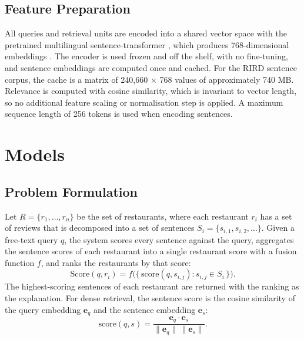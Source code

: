\subsection{Feature Preparation}
\label{sec:features}

All queries and retrieval units are encoded into a shared vector space with the pretrained multilingual sentence-transformer \mpnet{}, which produces 768-dimensional embeddings \citep{reimers2019}. The encoder is used frozen and off the shelf, with no fine-tuning, and sentence embeddings are computed once and cached. For the RIRD sentence corpus, the cache is a matrix of 240,660 $\times$ 768 values of approximately 740 MB. Relevance is computed with cosine similarity, which is invariant to vector length, so no additional feature scaling or normalisation step is applied. A maximum sequence length of 256 tokens is used when encoding sentences.

\section{Models}
\label{sec:models}

\subsection{Problem Formulation}
\label{sec:formulation}

Let $R=\{r_1,\dots,r_n\}$ be the set of restaurants, where each restaurant $r_i$ has a set of reviews that is decomposed into a set of sentences $S_i=\{s_{i,1},s_{i,2},\dots\}$. Given a free-text query $q$, the system scores every sentence against the query, aggregates the sentence scores of each restaurant into a single restaurant score with a fusion function $f$, and ranks the restaurants by that score:
\begin{equation}
\mathrm{Score}(q,r_i) = f\big(\{\,\mathrm{score}(q,s_{i,j}) : s_{i,j}\in S_i\,\}\big).
\label{eq:fusion}
\end{equation}
The highest-scoring sentences of each restaurant are returned with the ranking as the explanation. For dense retrieval, the sentence score is the cosine similarity of the query embedding $\mathbf{e}_q$ and the sentence embedding $\mathbf{e}_s$:
\begin{equation}
\mathrm{score}(q,s)=\frac{\mathbf{e}_q\cdot\mathbf{e}_s}{\lVert\mathbf{e}_q\rVert\,\lVert\mathbf{e}_s\rVert}.
\label{eq:cosine}
\end{equation}

